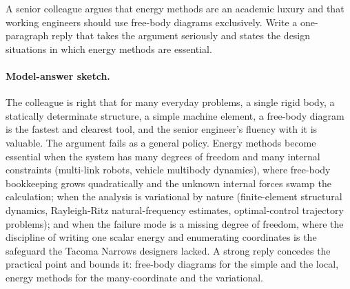 \begin{exercise}
A senior colleague argues that energy methods are an academic
luxury and that working engineers should use free-body diagrams
exclusively. Write a one-paragraph reply that takes the argument
seriously and states the design situations in which energy methods
are essential.

\paragraph{Model-answer sketch.} The colleague is right that for many
everyday problems, a single rigid body, a statically determinate
structure, a simple machine element, a free-body diagram is the fastest
and clearest tool, and the senior engineer's fluency with it is
valuable. The argument fails as a general policy. Energy methods become
essential when the system has many degrees of freedom and many internal
constraints (multi-link robots, vehicle multibody dynamics), where
free-body bookkeeping grows quadratically and the unknown internal
forces swamp the calculation; when the analysis is variational by nature
(finite-element structural dynamics, Rayleigh-Ritz natural-frequency
estimates, optimal-control trajectory problems); and when the failure
mode is a missing degree of freedom, where the discipline of writing one
scalar energy and enumerating coordinates is the safeguard the
Tacoma Narrows designers lacked. A strong reply concedes the practical
point and bounds it: free-body diagrams for the simple and the
local, energy methods for the many-coordinate and the variational.
\end{exercise}

